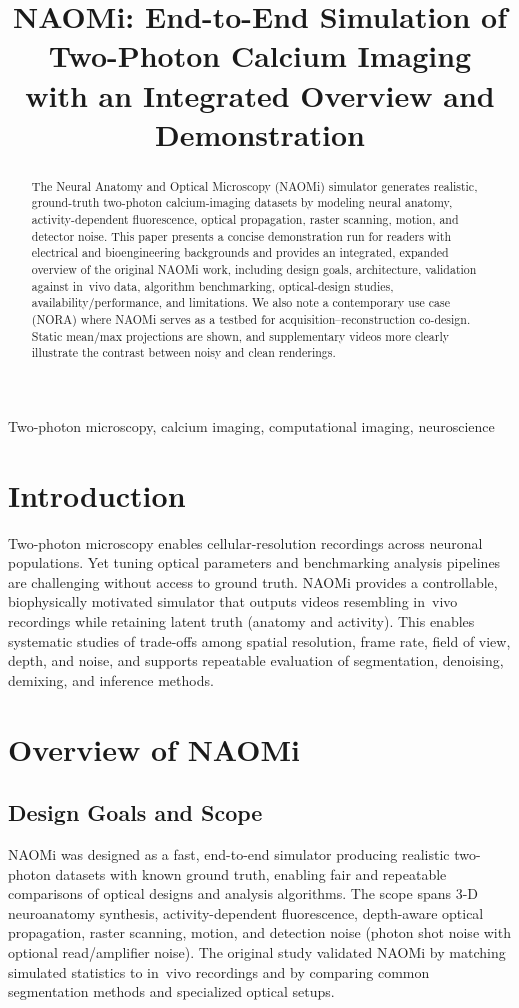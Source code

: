 \documentclass[conference]{IEEEtran}
\title{NAOMi: End-to-End Simulation of Two-Photon Calcium Imaging\\with an Integrated Overview and Demonstration}
\author{\IEEEauthorblockN{Jaeho Cho}
\IEEEauthorblockA{The Cooper Union\\New York, NY, USA\\Email: jaeho.cho@cooper.edu}}
\begin{document}
\maketitle

\begin{abstract}
The Neural Anatomy and Optical Microscopy (NAOMi) simulator generates realistic, ground-truth two-photon calcium-imaging datasets by modeling neural anatomy, activity-dependent fluorescence, optical propagation, raster scanning, motion, and detector noise. This paper presents a concise demonstration run for readers with electrical and bioengineering backgrounds and provides an integrated, expanded overview of the original NAOMi work, including design goals, architecture, validation against in~vivo data, algorithm benchmarking, optical-design studies, availability/performance, and limitations. We also note a contemporary use case (NORA) where NAOMi serves as a testbed for acquisition--reconstruction co-design. Static mean/max projections are shown, and supplementary videos more clearly illustrate the contrast between noisy and clean renderings.
\end{abstract}

\begin{IEEEkeywords}
Two-photon microscopy, calcium imaging, computational imaging, neuroscience
\end{IEEEkeywords}

\section{Introduction}
Two-photon microscopy enables cellular-resolution recordings across neuronal populations. Yet tuning optical parameters and benchmarking analysis pipelines are challenging without access to ground truth. NAOMi provides a controllable, biophysically motivated simulator that outputs videos resembling in~vivo recordings while retaining latent truth (anatomy and activity). This enables systematic studies of trade-offs among spatial resolution, frame rate, field of view, depth, and noise, and supports repeatable evaluation of segmentation, denoising, demixing, and inference methods.

\section{Overview of NAOMi}\label{sec:overview}
\subsection{Design Goals and Scope}
NAOMi was designed as a fast, end-to-end simulator producing realistic two-photon datasets with known ground truth, enabling fair and repeatable comparisons of optical designs and analysis algorithms. The scope spans 3-D neuroanatomy synthesis, activity-dependent fluorescence, depth-aware optical propagation, raster scanning, motion, and detection noise (photon shot noise with optional read/amplifier noise). The original study validated NAOMi by matching simulated statistics to in~vivo recordings and by comparing common segmentation methods and specialized optical setups.
\end{document}
